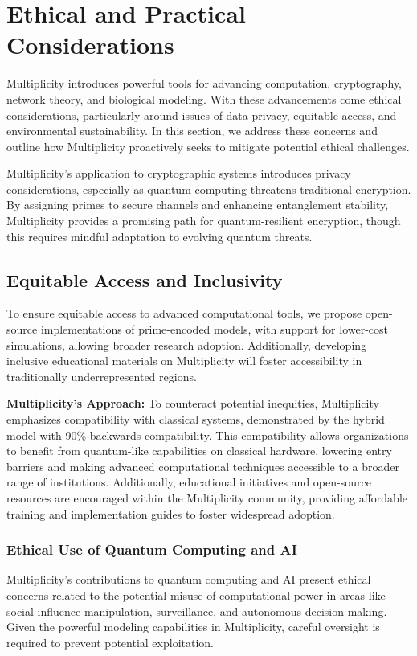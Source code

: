 \documentclass{article}
\begin{document}
\section{Ethical and Practical Considerations}

Multiplicity introduces powerful tools for advancing computation, cryptography, network theory, and biological modeling. With these advancements come ethical considerations, particularly around issues of data privacy, equitable access, and environmental sustainability. In this section, we address these concerns and outline how Multiplicity proactively seeks to mitigate potential ethical challenges.

Multiplicity’s application to cryptographic systems introduces privacy considerations, especially as quantum computing threatens traditional encryption. By assigning primes to secure channels and enhancing entanglement stability, Multiplicity provides a promising path for quantum-resilient encryption, though this requires mindful adaptation to evolving quantum threats.

\subsection{Equitable Access and Inclusivity}
To ensure equitable access to advanced computational tools, we propose open-source implementations of prime-encoded models, with support for lower-cost simulations, allowing broader research adoption. Additionally, developing inclusive educational materials on Multiplicity will foster accessibility in traditionally underrepresented regions.


\textbf{Multiplicity’s Approach:} To counteract potential inequities, Multiplicity emphasizes compatibility with classical systems, demonstrated by the hybrid model with 90\% backwards compatibility. This compatibility allows organizations to benefit from quantum-like capabilities on classical hardware, lowering entry barriers and making advanced computational techniques accessible to a broader range of institutions. Additionally, educational initiatives and open-source resources are encouraged within the Multiplicity community, providing affordable training and implementation guides to foster widespread adoption.

\subsubsection{Ethical Use of Quantum Computing and AI}
Multiplicity’s contributions to quantum computing and AI present ethical concerns related to the potential misuse of computational power in areas like social influence manipulation, surveillance, and autonomous decision-making. Given the powerful modeling capabilities in Multiplicity, careful oversight is required to prevent potential exploitation.
\end{document}
